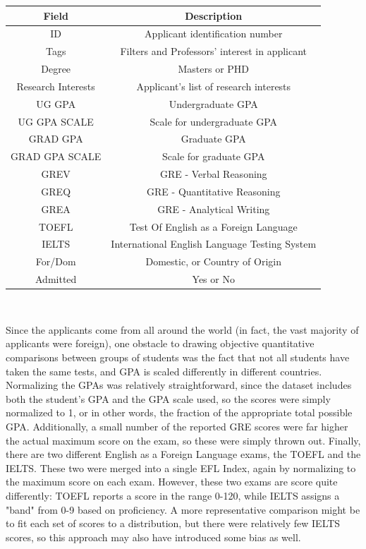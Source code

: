 \documentclass[]{article}
\begin{document}
		\begin{tabular}{c|c}
			Field & Description \\ \hline
			ID & Applicant identification number \\
			Tags & Filters and Professors' interest in applicant\\
			Degree & Masters or PHD\\
			Research Interests & Applicant's list of research interests\\
			UG GPA & Undergraduate GPA\\
			UG GPA SCALE & Scale for undergraduate GPA\\ 		 
			GRAD GPA & Graduate GPA\\
			GRAD GPA SCALE & Scale for graduate GPA\\
			GREV & GRE - Verbal Reasoning\\
			GREQ & GRE - Quantitative Reasoning\\
			GREA & GRE - Analytical Writing\\
			TOEFL & Test Of English as a Foreign Language\\
			IELTS & International English Language Testing System \\
			For/Dom & Domestic, or Country of Origin\\
			Admitted & Yes or No\\
		\end{tabular} \\
		
		\par Since the applicants come from all around the world (in fact, the vast majority of applicants were foreign), one obstacle to drawing objective quantitative comparisons between groups of students was the fact that not all students have taken the same tests, and GPA is scaled differently in different countries. Normalizing the GPAs was relatively straightforward, since the dataset includes both the student's GPA and the GPA scale used, so the scores were simply normalized to 1, or in other words, the fraction of the appropriate total possible GPA. Additionally, a small number of the reported GRE scores were far higher the actual maximum score on the exam\cite{GRE}, so these were simply thrown out. Finally, there are two different English as a Foreign Language exams, the TOEFL\cite{TOEFL} and the IELTS\cite{IELTS}. These two were merged into a single EFL Index, again by normalizing to the maximum score on each exam. However, these two exams are score quite differently: TOEFL reports a score in the range 0-120, while IELTS assigns a "band" from 0-9 based on proficiency. A more representative comparison might be to fit each set of scores to a distribution, but there were relatively few IELTS scores, so this approach may also have introduced some bias as well.
		
\end{document}

